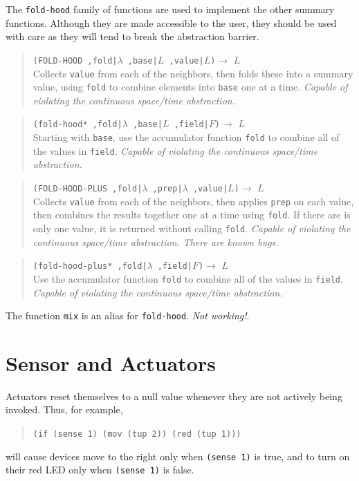 \documentclass{article}
\newcommand\broken{{\em Not working!}}
\newcommand\bugs{{\em There are known bugs.}}
\newcommand\violation{{\em Capable of violating the continuous
    space/time abstraction.}}
\newcommand\code[1]{\begin{quote}\var{#1}\end{quote}}
\newcommand\function[3]
{\begin{quote}{\tt #1}$\rightarrow$ \type{#2} \\ #3 \end{quote}}
\newcommand\type[1]{$#1$}
\newcommand\var[1]{{\tt #1}}
\begin{document}
The \var{fold-hood} family of functions are used to implement the
other summary functions.  Although they are made accessible to
the user, they should be used with care as they will tend to
break the abstraction barrier.

\function{(FOLD-HOOD ,fold|\type{\lambda} ,base|\type{L}
  ,value|\type{L})}{L}{Collects \var{value} from each of the neighbors,
  then folds these into a summary value, using \var{fold} to combine
  elements into \var{base} one at a time. \violation{}}

\function{(fold-hood* ,fold|\type{\lambda} ,base|\type{L} 
  ,field|\type{F})}{L}{Starting with \var{base}, use the accumulator
  function \var{fold} to combine all of the values in \var{field}.
  \violation{}}

\function{(FOLD-HOOD-PLUS ,fold|\type{\lambda} ,prep|\type{\lambda}
  ,value|\type{L})}{L}{Collects \var{value} from each of the
  neighbors, then applies \var{prep} on each value, then combines the
  results together one at a time using \var{fold}.  If there are is
  only one value, it is returned without calling \var{fold}.
  \violation{} \bugs{}}

\function{(fold-hood-plus* ,fold|\type{\lambda} ,field|\type{F})}{L}{
  Use the accumulator function \var{fold} to combine all of the values
  in \var{field}.  \violation{}}

The function \var{mix} is an alias for \var{fold-hood}. \broken{}.


\section{Sensor and Actuators}

Actuators reset themselves to a null value whenever they are not
actively being invoked.  Thus, for example, 
\code{(if (sense 1) (mov (tup 2)) (red (tup 1)))} 
will cause devices move to the right only when \var{(sense 1)} is
true, and to turn on their red LED only when \var{(sense 1)} is false.
\end{document}
